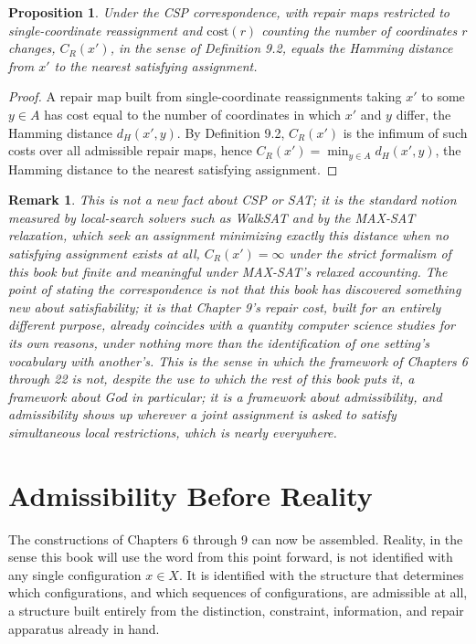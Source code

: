 \documentclass[11pt]{book}
\newtheorem*{appendixproposition}{Proposition}
\newtheorem*{appendixremark}{Remark}
\begin{document}
\begin{appendixproposition}
Under the CSP correspondence, with repair maps restricted to single-coordinate reassignment and $\mathrm{cost}(r)$ counting the number of coordinates $r$ changes, $C_R(x')$, in the sense of Definition 9.2, equals the Hamming distance from $x'$ to the nearest satisfying assignment.
\end{appendixproposition}

\begin{proof}
A repair map built from single-coordinate reassignments taking $x'$ to some $y \in A$ has cost equal to the number of coordinates in which $x'$ and $y$ differ, the Hamming distance $d_H(x', y)$. By Definition 9.2, $C_R(x')$ is the infimum of such costs over all admissible repair maps, hence $C_R(x') = \min_{y \in A} d_H(x', y)$, the Hamming distance to the nearest satisfying assignment.
\end{proof}

\begin{appendixremark}
This is not a new fact about CSP or SAT; it is the standard notion measured by local-search solvers such as WalkSAT and by the MAX-SAT relaxation, which seek an assignment minimizing exactly this distance when no satisfying assignment exists at all, $C_R(x') = \infty$ under the strict formalism of this book but finite and meaningful under MAX-SAT's relaxed accounting. The point of stating the correspondence is not that this book has discovered something new about satisfiability; it is that Chapter 9's repair cost, built for an entirely different purpose, already coincides with a quantity computer science studies for its own reasons, under nothing more than the identification of one setting's vocabulary with another's. This is the sense in which the framework of Chapters 6 through 22 is not, despite the use to which the rest of this book puts it, a framework about God in particular; it is a framework about admissibility, and admissibility shows up wherever a joint assignment is asked to satisfy simultaneous local restrictions, which is nearly everywhere.
\end{appendixremark}

\chapter{Admissibility Before Reality}

The constructions of Chapters 6 through 9 can now be assembled. Reality, in the sense this book will use the word from this point forward, is not identified with any single configuration $x \in X$. It is identified with the structure that determines which configurations, and which sequences of configurations, are admissible at all, a structure built entirely from the distinction, constraint, information, and repair apparatus already in hand.
\end{document}
